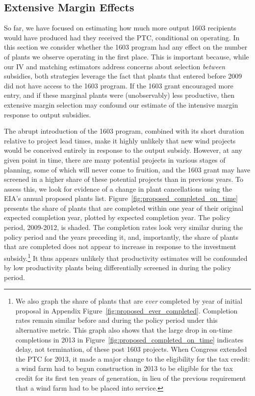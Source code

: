 \documentclass[12pt]{article}
\begin{document}
\subsection{Extensive Margin Effects \label{subsec:Extensive}}

So far, we have focused on estimating how much more output 1603 recipients would have produced had they received the PTC, conditional on operating. In this section we consider whether the 1603 program had any effect on the number of plants we observe operating in the first place. This is important because, while our IV and matching estimators address concerns about selection \textit{between} subsidies, both strategies leverage the fact that plants that entered before 2009 did not have access to the 1603 program. If the 1603 grant encouraged more entry, and if these marginal plants were (unobservably) less productive, then extensive margin selection may confound our estimate of the intensive margin response to output subsidies. 

The abrupt introduction of the 1603 program, combined with its short duration relative to project lead times, make it highly unlikely that new wind projects would be conceived entirely in response to the output subsidy. However, at any given point in time, there are many potential projects in various stages of planning, some of which will never come to fruition, and the 1603 grant may have screened in a higher share of these potential projects than in previous years. To assess this, we look for evidence of a change in plant cancellations using the EIA's annual proposed plants list. Figure~\ref{fig:proposed_completed_on_time} presents the share of plants that are completed within one year of their original expected completion year, plotted by expected completion year. The policy period, 2009-2012, is shaded. The completion rates look very similar during the policy period and the years preceding it, and, importantly, the share of plants that are completed does not appear to increase in response to the investment subsidy.\footnote{We also graph the share of plants that are \textit{ever} completed by year of initial proposal in Appendix Figure~\ref{fig:proposed_ever_completed}. Completion rates remain similar before and during the policy period under this alternative metric. This graph also shows that the large drop in on-time completions in 2013 in Figure~\ref{fig:proposed_completed_on_time} indicates delay, not termination, of these post 1603 projects. When Congress extended the PTC for 2013, it made a major change to the eligibility for the tax credit: a wind farm had to begun construction in 2013 to be eligible for the tax credit for its first ten years of generation, in lieu of the previous requirement that a wind farm had to be placed into service.} It thus appears unlikely that productivity estimates will be confounded by low productivity plants being differentially screened in during the policy period. 
\end{document}
